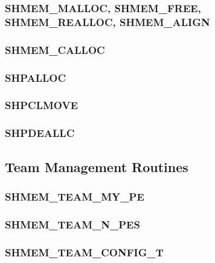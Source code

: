 \documentclass[10pt]{book}
\begin{document}
\subsubsection{\textbf{SHMEM\_MALLOC, SHMEM\_FREE, SHMEM\_REALLOC, SHMEM\_ALIGN}}\label{subsec:shfree}


\subsubsection{\textbf{SHMEM\_CALLOC}}\label{subsec:shmem_calloc}


\subsubsection{\textbf{SHPALLOC}}\label{subsec:shpalloc}


\subsubsection{\textbf{SHPCLMOVE}}\label{subsec:shpclmove}


\subsubsection{\textbf{SHPDEALLC}}\label{subsec:shpdeallc}





\color{Green}
\subsection{Team Management Routines}\label{subsec:team}


\subsubsection{\textbf{SHMEM\_TEAM\_MY\_PE}}\label{subsec:shmem_team_my_pe}


\subsubsection{\textbf{SHMEM\_TEAM\_N\_PES}}\label{subsec:shmem_team_n_pes}


\subsubsection{\textbf{SHMEM\_TEAM\_CONFIG\_T}}
\label{subsec:shmem_team_config_t}

\end{document}
